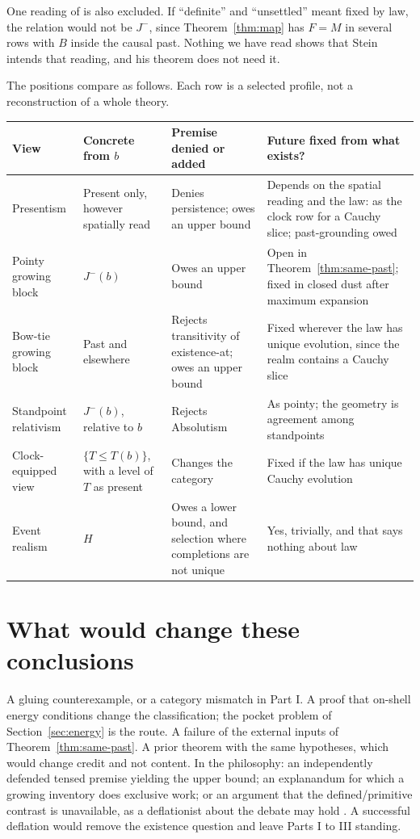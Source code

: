 \documentclass[11pt]{article}
\theoremstyle{definition}
\newcommand{\Jm}{J^{-}}
\begin{document}
One reading of \citet[pp.~148--149]{Stein1991} is also excluded. If ``definite'' and ``unsettled'' meant fixed by law, the relation would not be $\Jm$, since Theorem~\ref{thm:map} has $F=M$ in several rows with $B$ inside the causal past. Nothing we have read shows that Stein intends that reading, and his theorem does not need it.

The positions compare as follows. Each row is a selected profile, not a reconstruction of a whole theory.

\begin{center}
\begin{tabularx}{\textwidth}{@{}lYYY@{}}
\toprule
View & Concrete from $b$ & Premise denied or added & Future fixed from what exists?\\
\midrule
Presentism & Present only, however spatially read & Denies persistence; owes an upper bound & Depends on the spatial reading and the law: as the clock row for a Cauchy slice; past-grounding owed\\
Pointy growing block & $\Jm(b)$ & Owes an upper bound & Open in Theorem~\ref{thm:same-past}; fixed in closed dust after maximum expansion\\
Bow-tie growing block & Past and elsewhere & Rejects transitivity of existence-at; owes an upper bound & Fixed wherever the law has unique evolution, since the realm contains a Cauchy slice\\
Standpoint relativism & $\Jm(b)$, relative to $b$ & Rejects Absolutism & As pointy; the geometry is agreement among standpoints\\
Clock-equipped view & $\{T\le T(b)\}$, with a level of $T$ as present & Changes the category & Fixed if the law has unique Cauchy evolution\\
Event realism & $H$ & Owes a lower bound, and selection where completions are not unique & Yes, trivially, and that says nothing about law\\
\bottomrule
\end{tabularx}
\end{center}

\section{What would change these conclusions}\label{sec:defeat}

A gluing counterexample, or a category mismatch in Part I. A proof that on-shell energy conditions change the classification; the
pocket problem of Section~\ref{sec:energy} is the route. A failure of the external inputs of Theorem~\ref{thm:same-past}. A prior theorem with the same
hypotheses, which would change credit and not content. In the philosophy: an independently defended tensed premise yielding the upper bound; an
explanandum for which a growing inventory does exclusive work; or an argument that the defined/primitive contrast is unavailable, as a
deflationist about the debate may hold \citep{Savitt2006,Dorato2006}. A successful deflation would remove the existence question and leave Parts I to III standing.
\end{document}
